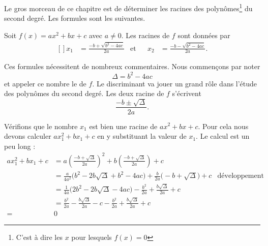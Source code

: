 Le gros morceau de ce chapitre est de déterminer les racines des polynômes\footnote{C'est à dire les \( x\) pour lesquels \( f(x)=0\)} du second degré. Les formules sont les suivantes.

\begin{Aretenir}
    Soit \( f(x)=ax^2+bx+c\) avec \( a\neq 0\). Les racines de \( f\) sont données par
    \begin{equation}    \label{EqmfNsjE}
        \begin{aligned}[]
            x_1&=\frac{ -b+\sqrt{b^2-4ac} }{ 2a }&\text{et}&&x_2&=\frac{ -b-\sqrt{b^2-4ac} }{ 2a }.
        \end{aligned}
    \end{equation}
\end{Aretenir}
Ces formules nécessitent de nombreux commentaires. Nous commençons par noter
\begin{equation}
    \Delta=b^2-4ac
\end{equation}
et appeler ce nombre le  de \( f\). Le discriminant va jouer un grand rôle dans l'étude des polynômes du second degré. Les deux racine de \( f\) s'écrivent 
\begin{equation}
    \frac{ -b\pm\sqrt{\Delta} }{ 2a }.
\end{equation}

Vérifions que le nombre \( x_1\) est bien une racine de \( ax^2+bx+c\). Pour cela nous devons calculer \( ax_1^2+bx_1+c\) en y substituant la valeur de \( x_1\). Le calcul est un peu long :
\begin{subequations}
    \begin{align}
        ax_1^2+bx_1+c&=a\left( \frac{ -b+\sqrt{\Delta} }{ 2a } \right)^2+b\left( \frac{ -b+\sqrt{\Delta} }{ 2a } \right)+c\\
        &=\frac{ a }{ 4a^2 }\big( b^2-2b\sqrt{\Delta}+b^2-4ac \big)+\frac{ b }{ 2a }\big( -b+\sqrt{\Delta} \big)+c&\text{développement du carré}\\
        &=\frac{1}{ 4a }\big( 2b^2-2b\sqrt{\Delta}-4ac \big)-\frac{ b^2 }{ 2a }+\frac{ b\sqrt{\Delta} }{ 2a }+c\\
        &=\frac{ b^2 }{ 2a }-\frac{ b\sqrt{\Delta} }{ 2a }-c-\frac{ b^2 }{ 2a }+\frac{ b\sqrt{\Delta} }{ 2a }+c\\
        =&0
    \end{align}
\end{subequations}

